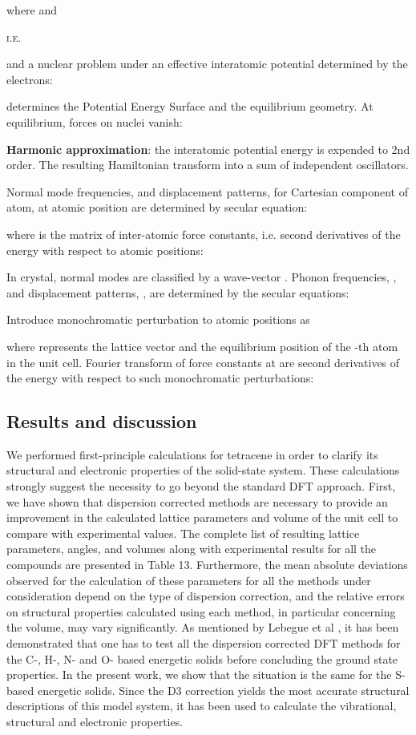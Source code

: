  where and 
 
 
 \textsc{i.e.}
 
 and a nuclear problem under an effective interatomic potential determined by the electrons:
 
 determines the Potential Energy Surface and the equilibrium geometry. At equilibrium, forces on nuclei vanish:
 
 \textbf{Harmonic approximation}: the interatomic potential energy is expended to 2nd order. The resulting Hamiltonian transform into a sum of independent oscillators.
 
 Normal mode frequencies, and displacement patterns,  for Cartesian component  of atom, at atomic position  are determined by secular equation:
 
 where is the matrix of inter-atomic force constants, i.e. second derivatives of the energy with respect to atomic positions:
 
 In crystal, normal modes are classified by a wave-vector . Phonon frequencies, , and displacement patterns, , are determined by the secular equations:
 
 Introduce monochromatic perturbation to atomic positions as
 
 where represents the lattice vector and the equilibrium position of the -th atom in the unit cell.
 Fourier transform of force constants at  are second derivatives of the energy with respect to such monochromatic perturbations:
 
 \subsection{Results and discussion}
 
 We performed first-principle calculations for tetracene in order to clarify its structural and electronic properties of the solid-state system. These calculations strongly suggest the necessity to go beyond the standard DFT approach. First, we have shown that dispersion corrected methods are necessary to provide an improvement in the calculated lattice parameters and volume of the unit cell to compare with experimental values. The complete list of resulting lattice parameters, angles, and volumes along with experimental results for all the compounds are presented in Table 13. Furthermore, the mean absolute deviations observed for the calculation of these parameters for all the methods under consideration depend on the type of dispersion correction, and the relative errors on structural properties calculated using each method, in particular concerning the volume, may vary significantly. As mentioned by Lebegue et al \cite{appalakondaiah2015dispersion}, it has been demonstrated that one has to test all the dispersion corrected DFT methods for the C-, H-, N- and O- based energetic solids before concluding the ground state properties. In the present work, we show that the situation is the same for the S-based energetic solids. Since the D3 correction yields the most accurate structural descriptions of this model system, it has been used to calculate the vibrational, structural and electronic properties.
 
